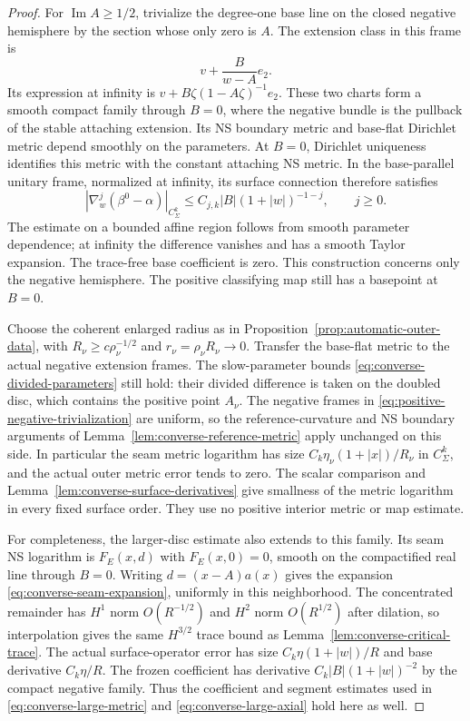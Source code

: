 \documentclass[11pt]{amsart}
\theoremstyle{definition}
\theoremstyle{remark}
\theoremstyle{plain}
\begin{document}
\begin{proof}
For $\operatorname{Im}A\geq1/2$, trivialize the degree-one
base line on the closed negative hemisphere by the section
whose only zero is $A$. The extension class in this frame is
\begin{equation}\label{eq:positive-negative-trivialization}
                  v+\frac{B}{w-A}e_2.
\end{equation}
Its expression at infinity is $v+B\zeta(1-A\zeta)^{-1}e_2$.
These two charts form a smooth compact family through $B=0$,
where the negative bundle is the pullback of the stable attaching
extension. Its NS boundary metric and base-flat Dirichlet metric
depend smoothly on the parameters. At $B=0$, Dirichlet uniqueness
identifies this metric with the constant attaching NS metric.
In the base-parallel unitary frame, normalized at infinity,
its surface connection therefore satisfies
\begin{equation}\label{eq:positive-negative-model-decay}
 |\nabla_w^j(\beta^0-\alpha)|_{C_\Sigma^k}
       \leq C_{j,k}|B|(1+|w|)^{-1-j},\qquad j\geq0.
\end{equation}
The estimate on a bounded affine region follows from smooth
parameter dependence; at infinity the difference vanishes and
has a smooth Taylor expansion. The trace-free base coefficient
is zero. This construction concerns only the negative hemisphere.
The positive classifying map still has a basepoint at $B=0$.

Choose the coherent enlarged radius as in
Proposition~\ref{prop:automatic-outer-data}, with
$R_\nu\geq c\rho_\nu^{-1/2}$ and
$r_\nu=\rho_\nu R_\nu\to0$.
Transfer the base-flat metric to the actual negative extension
frames. The slow-parameter bounds
\eqref{eq:converse-divided-parameters} still hold: their
divided difference is taken on the doubled disc, which
contains the positive point $A_\nu$.
The negative frames in \eqref{eq:positive-negative-trivialization}
are uniform, so the reference-curvature and NS boundary arguments
of Lemma~\ref{lem:converse-reference-metric} apply unchanged
on this side. In particular the seam metric logarithm has
size $C_k\eta_\nu(1+|x|)/R_\nu$ in $C_\Sigma^k$, and the
actual outer metric error tends to zero.
The scalar comparison and
Lemma~\ref{lem:converse-surface-derivatives} give smallness of
the metric logarithm in every fixed surface order.
They use no positive interior metric or map estimate.

For completeness, the larger-disc estimate also extends to this
family. Its seam NS logarithm is $F_E(x,d)$ with $F_E(x,0)=0$,
smooth on the compactified real line through $B=0$.
Writing $d=(x-A)a(x)$ gives the expansion
\eqref{eq:converse-seam-expansion}, uniformly in this neighborhood.
The concentrated remainder has $H^1$ norm $O(R^{-1/2})$ and
$H^2$ norm $O(R^{1/2})$ after dilation, so interpolation gives
the same $H^{3/2}$ trace bound as
Lemma~\ref{lem:converse-critical-trace}.
The actual surface-operator error has size
$C_k\eta(1+|w|)/R$ and base derivative $C_k\eta/R$.
The frozen coefficient has derivative
$C_k|B|(1+|w|)^{-2}$ by the compact negative family.
Thus the coefficient and segment estimates used in
\eqref{eq:converse-large-metric} and
\eqref{eq:converse-large-axial} hold here as well.


\end{proof}
\end{document}
